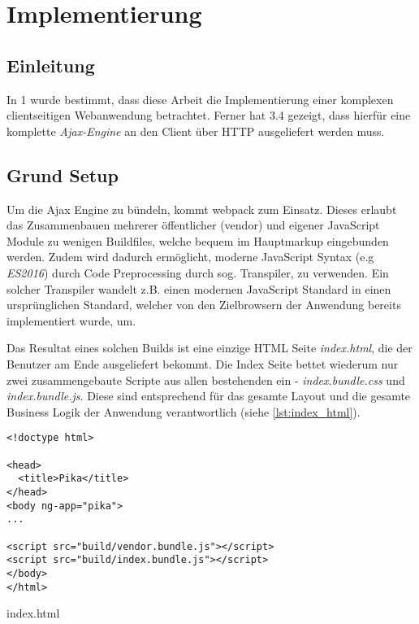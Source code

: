 \chapter{Implementierung}

\section{Einleitung}

In 1 wurde bestimmt, dass diese Arbeit die Implementierung einer komplexen clientseitigen Webanwendung betrachtet. Ferner hat 3.4 gezeigt, dass hierfür eine komplette \textit{Ajax-Engine} an den Client über HTTP ausgeliefert werden muss.

\section{Grund Setup}
\label{sec:grund_setup}

Um die Ajax Engine zu bündeln, kommt \gls{webpack} zum Einsatz. Dieses erlaubt das Zusammenbauen mehrerer öffentlicher (vendor) und eigener JavaScript Module zu wenigen Buildfiles, welche bequem im Hauptmarkup eingebunden werden. Zudem wird dadurch ermöglicht, moderne JavaScript Syntax (e.g \textit{ES2016}) durch Code Preprocessing durch sog. Transpiler, zu verwenden. Ein solcher Transpiler wandelt z.B. einen modernen JavaScript Standard in einen ursprünglichen Standard, welcher von den Zielbrowsern der Anwendung bereits implementiert wurde, um.

Das Resultat eines solchen Builds ist eine einzige HTML Seite \textit{index.html}, die der Benutzer am Ende ausgeliefert bekommt. Die Index Seite bettet wiederum nur zwei zusammengebaute Scripte aus allen bestehenden ein - \textit{index.bundle.css} und \textit{index.bundle.js}. Diese sind entsprechend für das gesamte Layout und die gesamte Business Logik der Anwendung verantwortlich (siehe \ref{lst:index_html}).

\begin{listing}[H]
\begin{verbatim}
<!doctype html>

<head>
  <title>Pika</title>
</head>
<body ng-app="pika">
...

<script src="build/vendor.bundle.js"></script>
<script src="build/index.bundle.js"></script>
</body>
</html>

\end{verbatim}
\caption{index.html}
\label{lst:index_html}
\end{listing}

